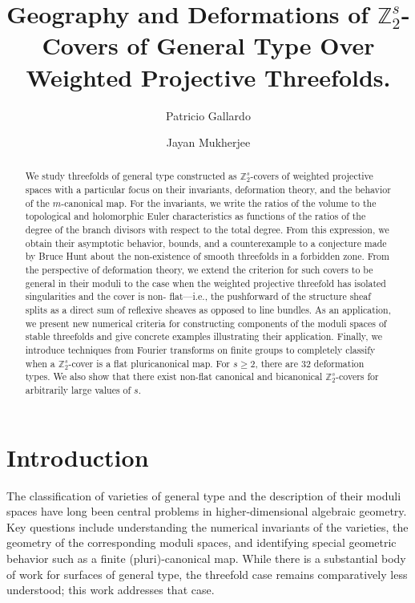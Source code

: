 \documentclass[12pt,twoside,]{amsart}
\title{
Geography and Deformations of
$\mathbb{Z}_2^s$-Covers of General Type Over Weighted Projective Threefolds.
}
\date{}
\author[P. Gallardo]{Patricio Gallardo}
\author[J. Mukherjee]{Jayan Mukherjee}
\theoremstyle{plain}
\theoremstyle{definition}
\begin{document}
\begin{abstract}
We study threefolds of general type constructed as $\mathbb{Z}_2^s$-covers of weighted projective spaces with a particular focus on their invariants, deformation theory, and the behavior of the $m$-canonical map.
For the invariants, we write the ratios of the volume to the topological and holomorphic Euler characteristics as functions of the ratios of the degree of the branch divisors with respect to the total degree. From this expression, we obtain their asymptotic behavior, bounds, and a counterexample to a conjecture made by Bruce Hunt about the non-existence of smooth threefolds in a forbidden zone. 
From the perspective of deformation theory, we extend the criterion for such covers to be general in their moduli to the case when the weighted projective threefold has isolated singularities and the cover is non- flat—i.e., the pushforward of the structure sheaf splits as a direct sum of reflexive sheaves as opposed to line bundles. As an application, we present new numerical criteria for constructing components of the moduli spaces of stable threefolds and give concrete examples illustrating their application. Finally, we introduce techniques from Fourier transforms on finite groups to completely classify when a $\mathbb{Z}_2^s$-cover is a flat pluricanonical map. For $s \geq 2$, there are $32$ deformation types. We also show that there exist non-flat canonical and bicanonical $\mathbb{Z}_2^s$-covers for arbitrarily large values of $s$. 
\end{abstract}
\maketitle

\section{Introduction}
The classification of varieties of general type and the description of their moduli spaces have long been central problems in higher-dimensional algebraic geometry.  Key questions include understanding the numerical invariants of the varieties, the geometry of the corresponding moduli spaces, and identifying special geometric behavior such as a finite (pluri)-canonical map.  While there is a substantial body of work for surfaces of general type, the threefold case remains comparatively less understood; this work addresses that case.
\end{document}
